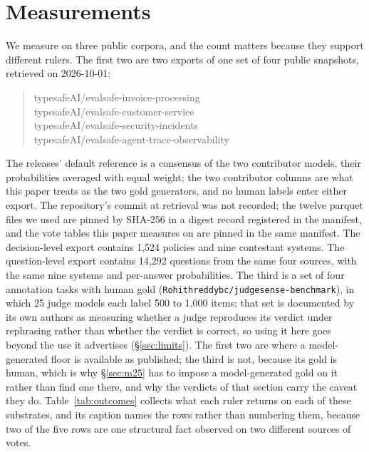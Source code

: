 \documentclass{article}
\begin{document}
\section{Measurements}
\label{sec:measure} We measure on three public corpora, and the count matters because they support different rulers. The first two are two exports of one set of four public snapshots, retrieved on 2026-10-01:
\begin{quote}\raggedright\ttfamily
typesafeAI/evalsafe-invoice-processing\\
typesafeAI/evalsafe-customer-service\\
typesafeAI/evalsafe-security-incidents\\
typesafeAI/evalsafe-agent-trace-observability
\end{quote} The releases' default reference is a consensus of the two contributor models, their probabilities averaged with equal weight; the two contributor columns are what this paper treats as the two gold generators, and no human labels enter either export. The repository's commit at retrieval was not recorded; the twelve parquet files we used are pinned by SHA-256 in a digest record registered in the manifest, and the vote tables this paper measures on are pinned in the same manifest. The decision-level export contains 1,524 policies and nine contestant systems. The question-level export contains 14,292 questions from the same four sources, with the same nine systems and per-answer probabilities. The third is a set of four annotation tasks with human gold (\texttt{Rohithreddybc/judgesense-benchmark}), in which 25 judge models each label 500 to 1,000 items; that set is documented by its own authors as measuring whether a judge reproduces its verdict under rephrasing rather than whether the verdict is correct, so using it here goes beyond the use it advertises (\S\ref{sec:limits}). The first two are where a model-generated floor is available as published; the third is not, because its gold is human, which is why \S\ref{sec:m25} has to impose a model-generated gold on it rather than find one there, and why the verdicts of that section carry the caveat they do. Table~\ref{tab:outcomes} collects what each ruler returns on each of these substrates, and its caption names the rows rather than numbering them, because two of the five rows are one structural fact observed on two different sources of votes.
\end{document}
